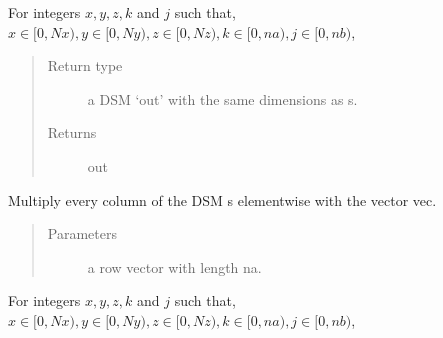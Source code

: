 \documentclass[letterpaper,10pt,english]{sphinxmanual}
\begin{document}
\begin{fulllineitems}
\begin{fulllineitems}
\begin{quote}
\begin{description}
\end{description}\end{quote}

For integers \(x,y,z,k\) and \(j\) such that,
\(x \in [0,Nx), y \in [0,Ny), z \in [0,Nz), k \in [0,na),j \in [0,nb)\),

\begin{sphinxVerbatim}[commandchars=\\\{\}]
\PYG{p}{[}\PYG{p}{]}\PYG{p}{[}\PYG{p}{]}\PYG{p}{[}\PYG{p}{]}
\end{sphinxVerbatim}
\begin{quote}\begin{description}
\item[{Return type}] \leavevmode
a DSM ‘out’ with the same dimensions as s.

\item[{Returns}] \leavevmode
out

\end{description}\end{quote}

\end{fulllineitems}


\begin{fulllineitems}
\label{\detokenize{index:DictionarySparseMatrix.DS.dict_vec_multiply}}
Multiply every column of the DSM s elementwise with the     vector vec.
\begin{quote}\begin{description}
\item[{Parameters}] \leavevmode
{} \textendash{} a row vector with length na.

\end{description}\end{quote}

For integers \(x,y,z,k\) and \(j\) such that,
\(x \in [0,Nx), y \in [0,Ny), z \in [0,Nz), k \in [0,na),j \in [0,nb)\),

\begin{sphinxVerbatim}[commandchars=\\\{\}]
\PYG{p}{[}\PYG{p}{]}\PYG{p}{[}\PYG{p}{]}\PYG{p}{[}\PYG{p}{]}
\end{sphinxVerbatim}


\end{fulllineitems}
\end{fulllineitems}
\end{document}
